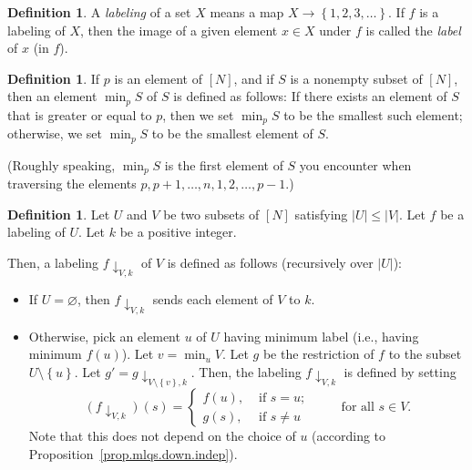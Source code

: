 \documentclass[reqno]{amsart}
\newcommand{\set}[1]{\left\{ #1 \right\}}
\newcommand{\abs}[1]{\left| #1 \right|}
\newcommand{\tup}[1]{\left( #1 \right)}
\newcommand{\ive}[1]{\left[ #1 \right]}
\newcommand{\defn}[1]{{\color{darkred}\emph{#1}}} %
\theoremstyle{plain}
\theoremstyle{definition}
\newtheorem{dfn}[thm]{Definition}
\numberwithin{equation}{section}
\begin{document}
\begin{dfn}
A \defn{labeling} of a set $X$ means a map
$X \to \set{1, 2, 3, \ldots}$.
If $f$ is a labeling of $X$, then the image of
a given element $x \in X$ under $f$ is called the
\defn{label} of $x$ (in $f$).
\end{dfn}

\begin{dfn}
If $p$ is an element of $\ive{N}$,
and if $S$ is a nonempty subset of $\ive{N}$,
then an element \defn{$\min_p S$} of $S$ is defined as
follows:
If there exists an element of $S$ that is greater
or equal to $p$, then we set $\min_p S$ to be the
smallest such element;
otherwise, we set $\min_p S$ to be the smallest
element of $S$.

(Roughly speaking, $\min_p S$ is the first element
of $S$ you encounter when traversing the elements
$p, p+1, \ldots, n, 1, 2, \ldots, p-1$.)
\end{dfn}

\begin{dfn} \label{def.mlqs.down}
Let $U$ and $V$ be two subsets of $\ive{N}$ satisfying
$\abs{U} \leq \abs{V}$.
Let $f$ be a labeling of $U$.
Let $k$ be a positive integer.

Then, a labeling \defn{$f \downarrow_{V, k}$} of $V$ is defined
as follows (recursively over $\abs{U}$):

\begin{itemize}
 \item If $U = \varnothing$, then $f \downarrow_{V, k}$ sends
       each element of $V$ to $k$.
 \item Otherwise, pick an element $u$ of $U$ having minimum
       label (i.e., having minimum $f \tup{u}$).
       Let $v = \min_u V$.
       Let $g$ be the restriction of $f$ to the subset
       $U \setminus \set{u}$.
       Let $g' = g \downarrow_{V \setminus \set{v}, k}$.
       Then, the labeling $f \downarrow_{V, k}$ is defined by
       setting
       \[
        \tup{f \downarrow_{V, k}} \tup{s}
        =
        \begin{cases}
         f \tup{u}, & \text{ if } s = u; \\
         g \tup{s}, & \text{ if } s \neq u
        \end{cases}
        \qquad \text{ for all } s \in V .
       \]
       Note that this does not depend on the choice of $u$
       (according to Proposition~\ref{prop.mlqs.down.indep}).
\end{itemize}

\end{dfn}
\end{document}
